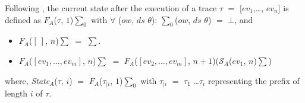 \documentclass[a4paper]{article}
\begin{document}
Following \cite{TaButin15}, the current state after the execution of a trace $\tau$ $=$ [$ev_1$,\dots, $ev_n$] is 
defined as $F_A$($\tau$, $1$)$\sum_0$ with $\forall$ ($ow$, $ds$  $\theta$):
$\sum_0$($ow$, $ds$  $\theta$) $=$ $\bot$, and 

\begin{itemize} 
\item $F_A$($[\ ]$, $n$)$\sum$ $=$ $\sum$.
\item $F_A$($[ev_1, \dots, ev_m]$, $n$)$\sum$ $=$ $F_A$($[ev_2, \dots, ev_m]$, $n+1$)($\mathcal{S}_A$($ev_1$, $n$)$\sum$)  
\end{itemize} 

where, \textit{State}$_A$($\tau$, $i$) $=$ $F_A$($\tau_{|i}$, $1$)$\sum_0$ with 
$\tau_{|i}$ $=$ $\tau_1$ \dots $\tau_i$ representing the prefix of length $i$ of $\tau$.
\end{document}
